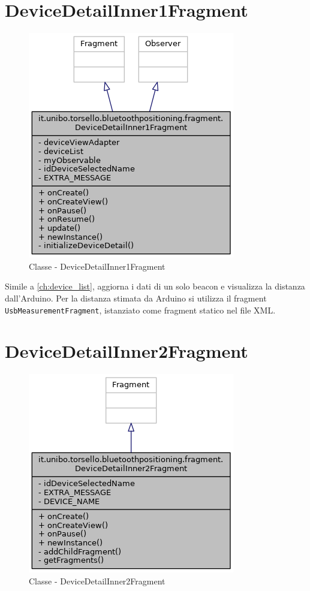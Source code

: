 \section{DeviceDetailInner1Fragment}
\begin{figure}[ph]
	\centering
	\includegraphics[width=0.6\linewidth]{img/uml/class/classit_1_1unibo_1_1torsello_1_1bluetoothpositioning_1_1fragment_1_1DeviceDetailInner1Fragment__inherit__graph.png}
	\caption{Classe - DeviceDetailInner1Fragment}
\end{figure}

Simile a \ref{ch:device_list}, aggiorna i dati di un solo beacon e visualizza la distanza dall'Arduino. Per la distanza stimata da Arduino si utilizza il fragment \texttt{UsbMeasurementFragment}, istanziato come fragment statico nel file XML.

\newpage
\section{DeviceDetailInner2Fragment}
\begin{figure}[ph]
	\centering
	\includegraphics[width=0.5\linewidth]{img/uml/class/classit_1_1unibo_1_1torsello_1_1bluetoothpositioning_1_1fragment_1_1DeviceDetailInner2Fragment__inherit__graph.png}
	\caption{Classe - DeviceDetailInner2Fragment}
\end{figure}

